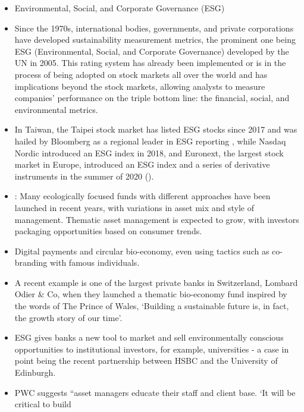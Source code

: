 \documentclass[
  letterpaper,
  DIV=11,
  numbers=noendperiod]{scrartcl}
\begin{document}
\begin{itemize}
\item
  Environmental, Social, and Corporate Governance (ESG)
\item
  Since the 1970s, international bodies, governments, and private
  corporations have developed sustainability measurement metrics, the
  prominent one being ESG (Environmental, Social, and Corporate
  Governance) developed by the UN in 2005. This rating system has
  already been implemented or is in the process of being adopted on
  stock markets all over the world and has implications beyond the stock
  markets, allowing analysts to measure companies' performance on the
  triple bottom line: the financial, social, and environmental metrics.
\item
  In Taiwan, the Taipei stock market has listed ESG stocks since 2017
  and was hailed by Bloomberg as a regional leader in ESG reporting
  \citep{grauerTaiwanLeadingWay2017}, while Nasdaq Nordic introduced an
  ESG index in 2018, and Euronext, the largest stock market in Europe,
  introduced an ESG index and a series of derivative instruments in the
  summer of 2020 (\citet{euronextEuronextLaunchesSuite2020}).
\item
  \citet{doornStocksThatShould2020}: Many ecologically focused funds
  with different approaches have been launched in recent years, with
  variations in asset mix and style of management. Thematic asset
  management is expected to grow, with investors packaging opportunities
  based on consumer trends.
\item
  \citet{kirakosianLOIMLaunchesCircular2020} Digital payments and
  circular bio-economy, even using tactics such as co-branding with
  famous individuals.
\item
  \citet{jerseyeveningpostCharlesAchievingSustainable2020} A recent
  example is one of the largest private banks in Switzerland, Lombard
  Odier \& Co, when they launched a thematic bio-economy fund inspired
  by the words of The Prince of Wales, `Building a sustainable future
  is, in fact, the growth story of our time'.
\item
  \citet{reidUniversityEdinburghGoes2020} ESG gives banks a new tool to
  market and sell environmentally conscious opportunities to
  institutional investors, for example, universities - a case in point
  being the recent partnership between HSBC and the University of
  Edinburgh.
\item
  \citet{pwc2022GrowthOpportunity2020} PWC suggests ``asset managers
  educate their staff and client base. `It will be critical to build

\end{itemize}
\end{document}
